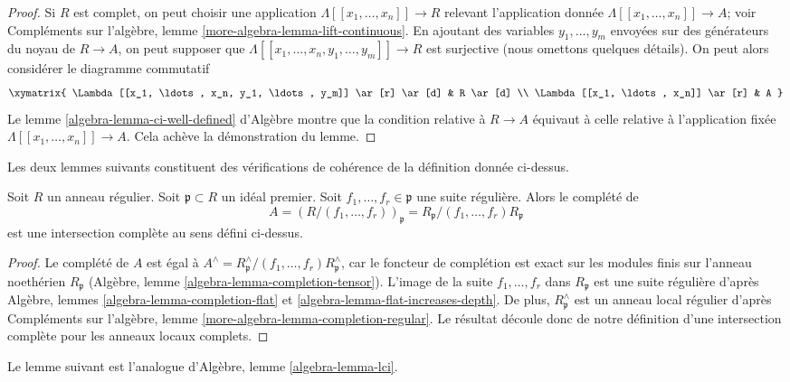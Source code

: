 \begin{proof}
\medskip\noindent
Si $R$ est complet, on peut choisir une application
$\Lambda[[x_1, \ldots, x_n]] \to R$ relevant l'application donnée
$\Lambda[[x_1, \ldots, x_n]] \to A$; voir
Compléments sur l'algèbre, lemme \ref{more-algebra-lemma-lift-continuous}.
En ajoutant des variables $y_1, \ldots, y_m$ envoyées
sur des générateurs du noyau de $R \to A$, on peut supposer que
$\Lambda[[x_1, \ldots, x_n, y_1, \ldots, y_m]] \to R$ est surjective
(nous omettons quelques détails). On peut alors considérer le diagramme commutatif
$$
\xymatrix{
\Lambda[[x_1, \ldots, x_n, y_1, \ldots, y_m]] \ar[r] \ar[d] & R \ar[d] \\
\Lambda[[x_1, \ldots, x_n]] \ar[r] & A
}
$$
Le lemme \ref{algebra-lemma-ci-well-defined} d'Algèbre montre que
la condition relative à $R \to A$ équivaut à celle relative à
l'application fixée
$\Lambda[[x_1, \ldots, x_n]] \to A$. Cela achève la démonstration du lemme.
\end{proof}

\noindent
Les deux lemmes suivants constituent des vérifications de cohérence de la définition donnée ci-dessus.

\begin{lemma}
\label{lemma-quotient-regular-ring-by-regular-sequence}
Soit $R$ un anneau régulier. Soit $\mathfrak p \subset R$ un idéal premier.
Soit $f_1, \ldots, f_r \in\mathfrak p$ une suite régulière.
Alors le complété de
$$
A = (R/(f_1, \ldots, f_r))_\mathfrak p =
R_\mathfrak p/(f_1, \ldots, f_r)R_\mathfrak p
$$
est une intersection complète au sens défini ci-dessus.
\end{lemma}

\begin{proof}
Le complété de $A$ est égal à
$A^\wedge = R_\mathfrak p^\wedge/(f_1, \ldots, f_r)R_\mathfrak p^\wedge$,
car le foncteur de complétion est exact sur les modules finis sur l'anneau noethérien
$R_\mathfrak p$ (Algèbre,
lemme \ref{algebra-lemma-completion-tensor}).
L'image de la suite $f_1, \ldots, f_r$ dans $R_\mathfrak p$
est une suite régulière
d'après Algèbre, lemmes \ref{algebra-lemma-completion-flat} et
\ref{algebra-lemma-flat-increases-depth}.
De plus, $R_\mathfrak p^\wedge$ est un anneau local régulier d'après
Compléments sur l'algèbre, lemme \ref{more-algebra-lemma-completion-regular}. Le
résultat découle donc de notre définition d'une intersection
complète pour les anneaux locaux complets.
\end{proof}

\noindent
Le lemme suivant est l'analogue d'Algèbre, lemme \ref{algebra-lemma-lci}.

